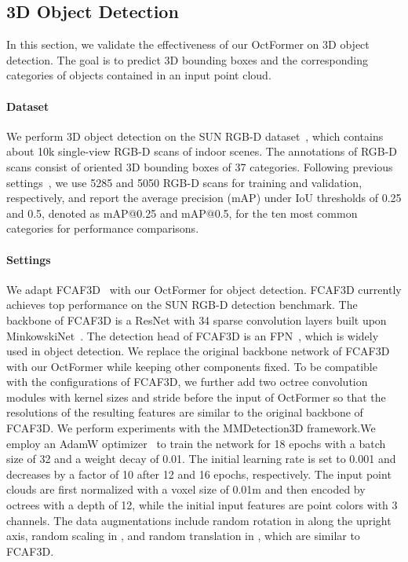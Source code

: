 \documentclass[acmtog,screen,authorversion]{acmart}
\begin{document}
\subsection{3D Object Detection}
In this section, we  validate the effectiveness of our OctFormer on 3D object detection.
The goal is to predict 3D bounding boxes and the corresponding categories of objects contained in an input point cloud. 



\paragraph{Dataset}
We perform 3D object detection on the SUN RGB-D dataset~\cite{Song2015}, which contains about 10k single-view RGB-D scans of indoor scenes.
The annotations of RGB-D scans consist of oriented 3D bounding boxes of 37 categories.
Following previous settings~\cite{Qi2019,Rukhovich2022}, we use 5285 and 5050 RGB-D scans for training and validation, respectively, and report the average precision (mAP) under IoU thresholds of 0.25 and 0.5, denoted as mAP@0.25 and mAP@0.5, for the ten most common categories for performance comparisons.


\paragraph{Settings}
We adapt FCAF3D~\cite{Rukhovich2022} with our OctFormer for object detection.
FCAF3D currently achieves top performance on the SUN RGB-D detection benchmark.
The backbone of FCAF3D is a ResNet with 34 sparse convolution layers built upon MinkowskiNet~\cite{Choy2019}.
The detection head of FCAF3D is an FPN~\cite{Lin2017}, which is widely used in object detection.
We replace the original backbone network of FCAF3D with our OctFormer while keeping other components fixed.
To be compatible with the configurations of FCAF3D, we further add two octree convolution modules with kernel sizes  and stride  before the input of OctFormer so that the resolutions of the resulting features are similar to the original backbone of FCAF3D.
We perform experiments with the MMDetection3D framework.We employ an AdamW optimizer~\cite{Loshchilov2017} to train the network for 18 epochs with a batch size of 32 and a weight decay of 0.01.
The initial learning rate is set to 0.001 and decreases by a factor of 10 after 12 and 16 epochs, respectively.
The input point clouds are first normalized with a voxel size of 0.01m and then encoded by octrees with a depth of 12, while the initial input features are point colors with 3 channels.
The data augmentations include random rotation in  along the upright axis, random scaling in , and random translation in , which are similar to FCAF3D.
\end{document}
